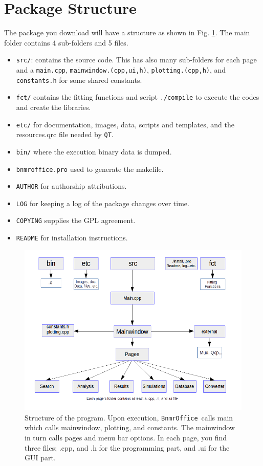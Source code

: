 \documentclass[10pt,letterpaper,oneside]{article}
\newcommand{\qt}{\texttt{QT}}
\newcommand{\bof}{\texttt{BnmrOffice}}
\newcommand{\fig}[1]{Fig. \ref{#1}}
\begin{document}
\newpage

\section{Package Structure}
The package you download will have a structure as shown 
in \fig{fig-str}. The main folder contains 4 sub-folders and 5 files.
\begin{itemize}
 \item \verb+src/+: contains the source code. This has also
 many sub-folders for each page and a \verb+main.cpp+, 
 \verb+mainwindow.(cpp,ui,h)+, \verb+plotting.(cpp,h)+, and
 \verb+constants.h+ for some shared constants.
 \item \verb+fct/+ contains the fitting functions and script \verb+./compile+
 to execute the codes and create the libraries.
 \item \verb+etc/+ for documentation, images, data, scripts
and templates, and the resources.qrc file needed by \qt.
\item \verb+bin/+ where the execution binary data is dumped.
 \item \verb+bnmroffice.pro+ used to generate the makefile.
 \item  \verb+AUTHOR+ for authorship attributions.
 \item \verb+LOG+ for keeping a log of the package changes over time.
 \item \verb+COPYING+ supplies the GPL agreement.
 \item \verb+README+ for installation instructions.
 \end{itemize}
\begin{figure}[h]
\includegraphics[width=\textwidth]{structure.png}
 \caption{Structure of the program. Upon execution,  \bof\ calls main which calls mainwindow, plotting, and constants. The mainwindow in turn calls pages and menu bar options. In each page, you find three files; .cpp, and .h for the programming part, and .ui for the GUI part.}
 \label{fig-str}
 \end{figure}
\newpage
\end{document}

